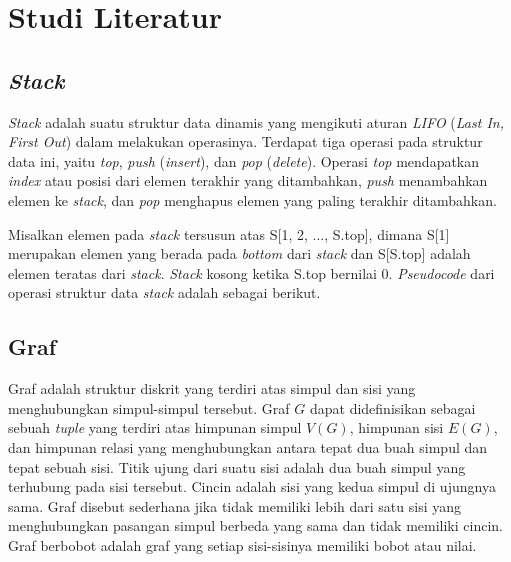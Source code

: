 \chapter{Studi Literatur}

\section{\textit{Stack}}

\textit{Stack} adalah suatu struktur data dinamis yang mengikuti aturan \textit{LIFO} (\textit{Last In, First Out}) dalam melakukan operasinya. 
Terdapat tiga operasi pada struktur data ini, yaitu \textit{top}, \textit{push} (\textit{insert}), dan \textit{pop} (\textit{delete}).
Operasi \textit{top} mendapatkan \textit{index} atau posisi dari elemen terakhir yang ditambahkan, \textit{push} 
menambahkan elemen ke \textit{stack}, dan \textit{pop} menghapus elemen yang paling terakhir ditambahkan.

Misalkan elemen pada \textit{stack} tersusun atas S[1, 2, ..., S.top], dimana S[1] merupakan elemen yang berada pada \textit{bottom} dari \textit{stack}
dan S[S.top] adalah elemen teratas dari \textit{stack}. \textit{Stack} kosong ketika S.top bernilai 0. \textit{Pseudocode} dari 
operasi struktur data \textit{stack} adalah sebagai berikut.

\medskip

\medskip

\medskip

\medskip


\section{Graf}

Graf adalah struktur diskrit yang terdiri atas simpul dan sisi yang menghubungkan simpul-simpul tersebut. Graf $G$ dapat didefinisikan sebagai sebuah \textit{tuple} yang 
terdiri atas himpunan simpul $V(G)$, himpunan sisi $E(G)$, dan himpunan relasi yang menghubungkan antara tepat dua buah simpul dan tepat sebuah sisi. Titik ujung dari suatu sisi 
adalah dua buah simpul yang terhubung pada sisi tersebut. Cincin adalah sisi yang kedua simpul di ujungnya sama. Graf disebut sederhana jika tidak memiliki lebih 
dari satu sisi yang menghubungkan pasangan simpul berbeda yang sama dan tidak memiliki cincin. Graf berbobot adalah graf yang setiap sisi-sisinya memiliki bobot atau nilai.

